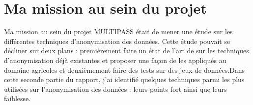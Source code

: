  \section{Ma mission au sein du projet} 

Ma mission au sein du projet MULTIPASS était de mener une étude sur les différentes techniques d’anonymisation des données. Cette étude pouvait se décliner sur deux plans : premièrement faire un état de l’art de sur les techniques d’anonymisation déjà existantes et proposer une façon de les appliqués au domaine agricoles et deuxièmement faire des tests sur des jeux de données.Dans cette seconde partie du rapport, j'ai identifié quelques techniques parmi les plus utilisées sur l’anonymisation des données : leurs points fort ainsi que leurs faiblesse. 